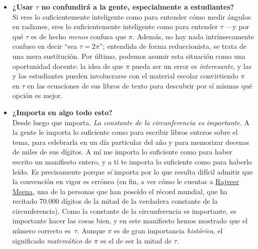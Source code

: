 \begin{itemize}
  \item \textbf{¿Usar $\tau$ no confundirá a la gente, especialmente a estudiantes?} \\  Si eres lo suficientemente inteligente como para entender cómo medir ángulos en radianes, eres lo suficientemente inteligente como para entender $\tau$ ---y por qué $\tau$ es de hecho \emph{menos} confusa que $\pi$. Además, no hay nada intrínsecamente confuso en decir ``sea $\tau = 2\pi$''; entendida de forma reduccionista, se trata de una mera sustitución. Por último, podemos asumir esta situación como una oportunidad docente: la idea de que $\pi$ pueda ser un error es \emph{interesante}, y las y los estudiantes pueden involucrarse con el material escolar convirtiendo $\pi$ en $\tau$ en las ecuaciones de sus libros de texto para descubrir por sí mismas qué opción es mejor.

  \item \textbf{¿Importa en algo todo esto?} \\ Desde luego que importa. \emph{La constante de la circunferencia es importante.} A la gente le importa lo suficiente como para escribir libros enteros sobre el tema, para celebrarla en un día particular del año y para memorizar decenas de miles de sus dígitos. A mí me importa lo suficiente como para haber escrito un manifiesto entero, y a ti te importa lo suficiente como para haberlo leído. Es precisamente porque \emph{sí} importa por lo que resulta difícil admitir que la convención en vigor es errónea (en fin, a ver cómo le cuentas a \href{https://www.guinnessworldrecords.com/world-records/most-pi-places-memorised}{Rajveer Meena}, una de la personas que han poseído el récord mundial, que ha recitado 70.000 dígitos de la mitad de la verdadera constante de la circunferencia). Como la constante de la circunferencia es importante, es importante hacer las cosas bien, y en este manifiesto hemos mostrado que el número correcto es~$\tau$. Aunque $\pi$ es de gran importancia \emph{histórica}, el significado \emph{matemático} de $\pi$ es el de ser la mitad de $\tau$.


\end{itemize}
